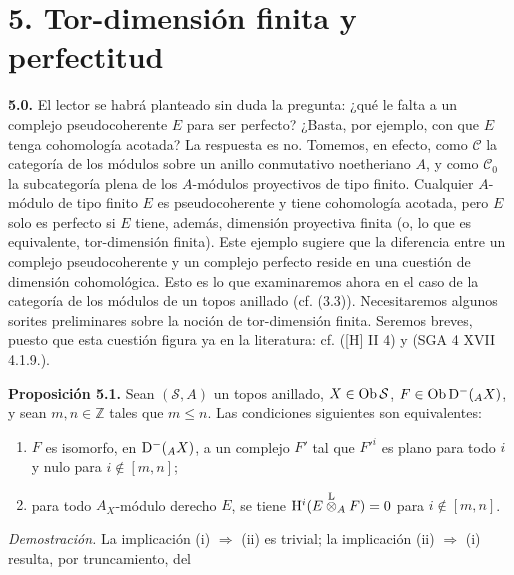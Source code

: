 
\providecommand{\sisi}[2]{#2}

\section*{5. Tor-dimensión finita y perfectitud}

\textbf{5.0.} El lector se habrá planteado sin duda la pregunta: ¿qué le falta a un complejo pseudocoherente \(E\) para ser perfecto? ¿Basta, por ejemplo, con que \(E\) tenga cohomología acotada? La respuesta es no. Tomemos, en efecto, como \(\mathcal C\) la categoría de los módulos sobre un anillo conmutativo noetheriano \(A\), y como \(\mathcal C_0\) la subcategoría plena de los \(A\)-módulos proyectivos de tipo finito. Cualquier \(A\)-módulo de tipo finito \(E\) es pseudocoherente y tiene cohomología acotada, pero \(E\) solo es perfecto si \(E\) tiene, además, dimensión proyectiva finita (o, lo que es equivalente, tor-dimensión finita). Este ejemplo sugiere que la diferencia entre un complejo pseudocoherente y un complejo perfecto reside en una cuestión de dimensión cohomológica. Esto es lo que examinaremos ahora en el caso de la categoría de los módulos de un topos anillado (cf. (3.3)). Necesitaremos algunos sorites preliminares sobre la noción de tor-dimensión finita. Seremos breves, puesto que esta cuestión figura ya en la literatura: cf. ([H] II 4) y (SGA 4 XVII 4.1.9.).

\textbf{Proposición 5.1.} Sean \((\sisi{S}{\mathcal S},A)\) un topos anillado, \(X\in\Ob \sisi{S}{\mathcal S}\), \(F\in\operatorname{Ob}\mathrm D^-({}_A X)\), y sean \(m,n\in\mathbb Z\) tales que \(\sisi{m<n}{m\leq n}\). Las condiciones siguientes son equivalentes:
\begin{enumerate}[label=(\roman*)]
\item \(F\) es isomorfo, en \(\mathrm D^-({}_A X)\), a un complejo \(F'\) tal que \(F'^i\) es plano para todo \(i\) y nulo para \(i\notin[m,n]\);
\item para todo \(A_X\)-módulo derecho \(E\), se tiene \(\mathrm H^i(E\overset{\mathrm L}{\otimes}_A F)=0\) para \(i\notin[m,n]\).
\end{enumerate}

\emph{Demostración.} La implicación (i) \(\Rightarrow\) (ii) es trivial; la implicación (ii) \(\Rightarrow\) (i) resulta, por truncamiento, del


